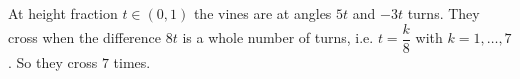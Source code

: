 At height fraction $t\in(0,1)$ the vines are at angles $5t$ and $-3t$ turns. They cross when the difference $8t$ is a whole number of turns, i.e. $t=\dfrac k8$ with $k=1,\dots,7$. So they cross $\boxed{7}$ times.
